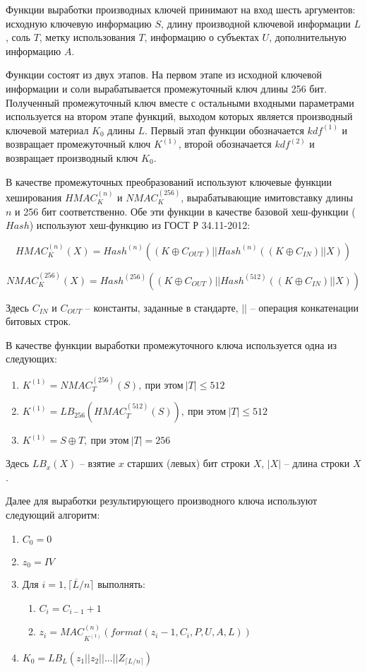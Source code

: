 Функции выработки производных ключей принимают на вход шесть аргументов: исходную ключевую информацию $S$, длину производной ключевой информации $L$, соль $T$, метку использования $T$, информацию о субъектах $U$, дополнительную информацию $A$.

Функции состоят из двух этапов. На первом этапе из исходной ключевой информации и соли вырабатывается промежуточный ключ длины 256 бит. Полученный промежуточный ключ вместе с остальными входными параметрами используется на втором этапе функций, выходом которых является производный ключевой материал $K_0$ длины $L$. Первый этап функции обозначается $kdf^{(1)}$ и возвращает промежуточный ключ $K^{(1)}$, второй обозначается $kdf^{(2)}$ и возвращает производный ключ $K_0$.

В качестве промежуточных преобразований используют ключевые функции хеширования $HMAC_K^{(n)}$ и $NMAC_K^{(256)}$, вырабатывающие имитовставку длины $n$ и 256 бит соответственно. Обе эти функции в качестве базовой хеш-функции ($Hash$) используют хеш-функцию из ГОСТ Р 34.11-2012:

$$ HMAC_K^{(n)}(X) = Hash^{(n)} \left( (K \oplus C_{OUT}) || Hash^{(n)}((K \oplus C_{IN}) || X) \right) $$

$$ NMAC_K^{(256)}(X) = Hash^{(256)} \left( (K \oplus C_{OUT}) || Hash^{(512)}((K \oplus C_{IN}) || X) \right) $$

Здесь $C_{IN}$ и $C_{OUT}$ -- константы, заданные в стандарте, $||$ -- операция конкатенации битовых строк. 

В качестве функции выработки промежуточного ключа используется одна из следующих:

\begin{enumerate}
	\item $K^{(1)} = NMAC_T^{(256)}(S),\ \text{при этом}\ |T| \leq 512$
	\item $K^{(1)} = LB_{256} (HMAC_T^{(512)}(S)),\ \text{при этом}\ |T| \leq 512$
	\item $K^{(1)} = S \oplus T,\ \text{при этом}\ |T| = 256$
\end{enumerate}

Здесь $LB_{x}(X)$ -- взятие $x$ старших (левых) бит строки $X$, $|X|$ -- длина строки $X$.

Далее для выработки результирующего производного ключа используют следующий алгоритм:

\renewcommand{\labelenumii}{\arabic{enumi}.\arabic{enumii})}
\begin{enumerate}
	\item $C_0 = 0$
	\item $z_0 = IV$
	\item Для $i = \overline{1, \lceil L / n \rceil}$ выполнять:
	\begin{enumerate}
		\item $C_i = C_{i - 1} + 1$
		\item $z_i = MAC_{K^{(1)}}^{(n)}(format(z_i - 1, C_i, P, U, A, L))$
	\end{enumerate}
	\item $K_0 = LB_L \left( z_1 || z_2 || ... || Z_{\lceil L/n \rceil} \right)$		
\end{enumerate}

